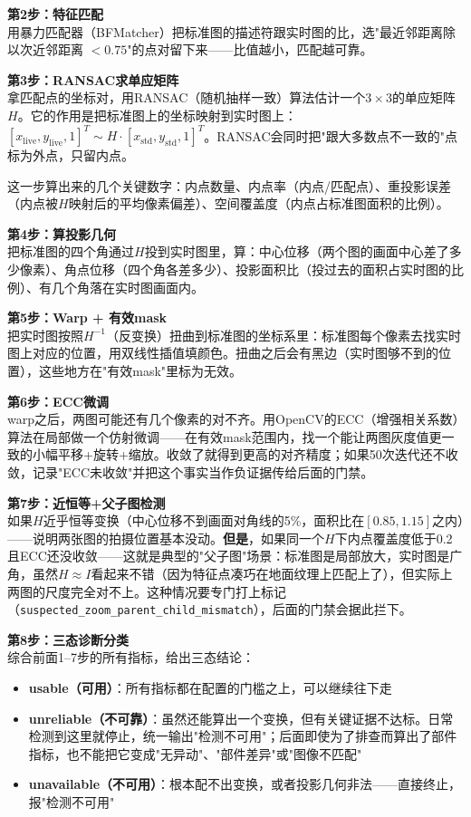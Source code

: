 \documentclass[12pt,a4paper]{ctexart}
\begin{document}
\textbf{第2步：特征匹配}\\[2pt]
用暴力匹配器（BFMatcher）把标准图的描述符跟实时图的比，选"最近邻距离除以次近邻距离 $< 0.75$"的点对留下来——比值越小，匹配越可靠。

\textbf{第3步：RANSAC求单应矩阵}\\[2pt]
拿匹配点的坐标对，用RANSAC（随机抽样一致）算法估计一个$3\times 3$的单应矩阵$H$。它的作用是把标准图上的坐标映射到实时图上：$[x_{\text{live}}, y_{\text{live}}, 1]^T \sim H \cdot [x_{\text{std}}, y_{\text{std}}, 1]^T$。RANSAC会同时把"跟大多数点不一致的"点标为外点，只留内点。

这一步算出来的几个关键数字：内点数量、内点率（内点/匹配点）、重投影误差（内点被$H$映射后的平均像素偏差）、空间覆盖度（内点占标准图面积的比例）。

\textbf{第4步：算投影几何}\\[2pt]
把标准图的四个角通过$H$投到实时图里，算：中心位移（两个图的画面中心差了多少像素）、角点位移（四个角各差多少）、投影面积比（投过去的面积占实时图的比例）、有几个角落在实时图画面内。

\textbf{第5步：Warp + 有效mask}\\[2pt]
把实时图按照$H^{-1}$（反变换）扭曲到标准图的坐标系里：标准图每个像素去找实时图上对应的位置，用双线性插值填颜色。扭曲之后会有黑边（实时图够不到的位置），这些地方在"有效mask"里标为无效。

\textbf{第6步：ECC微调}\\[2pt]
warp之后，两图可能还有几个像素的对不齐。用OpenCV的ECC（增强相关系数）算法在局部做一个仿射微调——在有效mask范围内，找一个能让两图灰度值更一致的小幅平移+旋转+缩放。收敛了就得到更高的对齐精度；如果50次迭代还不收敛，记录"ECC未收敛"并把这个事实当作负证据传给后面的门禁。

\textbf{第7步：近恒等+父子图检测}\\[2pt]
如果$H$近乎恒等变换（中心位移不到画面对角线的5\%，面积比在$[0.85,1.15]$之内）——说明两张图的拍摄位置基本没动。\textbf{但是}，如果同一个$H$下内点覆盖度低于0.2且ECC还没收敛——这就是典型的"父子图"场景：标准图是局部放大，实时图是广角，虽然$H\approx I$看起来不错（因为特征点凑巧在地面纹理上匹配上了），但实际上两图的尺度完全对不上。这种情况要专门打上标记（\texttt{suspected\_zoom\_parent\_child\_mismatch}），后面的门禁会据此拦下。

\textbf{第8步：三态诊断分类}\\[2pt]
综合前面1--7步的所有指标，给出三态结论：
\begin{itemize}
\item \textbf{usable（可用）}：所有指标都在配置的门槛之上，可以继续往下走
\item \textbf{unreliable（不可靠）}：虽然还能算出一个变换，但有关键证据不达标。日常检测到这里就停止，统一输出"检测不可用"；后面即使为了排查而算出了部件指标，也不能把它变成"无异动"、"部件差异"或"图像不匹配"
\item \textbf{unavailable（不可用）}：根本配不出变换，或者投影几何非法——直接终止，报"检测不可用"
\end{itemize}
\end{document}
